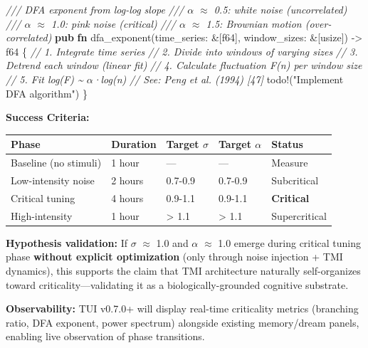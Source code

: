 \documentclass[
]{article}
\newenvironment{Shaded}{}{}
\newcommand{\CommentTok}[1]{\textcolor[rgb]{0.38,0.63,0.69}{\textit{#1}}}
\newcommand{\DataTypeTok}[1]{\textcolor[rgb]{0.56,0.13,0.00}{#1}}
\newcommand{\KeywordTok}[1]{\textcolor[rgb]{0.00,0.44,0.13}{\textbf{#1}}}
\newcommand{\NormalTok}[1]{#1}
\newcommand{\OperatorTok}[1]{\textcolor[rgb]{0.40,0.40,0.40}{#1}}
\newcommand{\PreprocessorTok}[1]{\textcolor[rgb]{0.74,0.48,0.00}{#1}}
\newcommand{\StringTok}[1]{\textcolor[rgb]{0.25,0.44,0.63}{#1}}
\begin{document}
\begin{Shaded}
\begin{Highlighting}[]
\CommentTok{/// DFA exponent from log{-}log slope}
\CommentTok{/// $\alpha$ $\approx$ 0.5: white noise (uncorrelated)}
\CommentTok{/// $\alpha$ $\approx$ 1.0: pink noise (critical)}
\CommentTok{/// $\alpha$ $\approx$ 1.5: Brownian motion (over{-}correlated)}
\KeywordTok{pub} \KeywordTok{fn}\NormalTok{ dfa\_exponent(time\_series}\OperatorTok{:} \OperatorTok{\&}\NormalTok{[}\DataTypeTok{f64}\NormalTok{]}\OperatorTok{,}\NormalTok{ window\_sizes}\OperatorTok{:} \OperatorTok{\&}\NormalTok{[}\DataTypeTok{usize}\NormalTok{]) }\OperatorTok{{-}\textgreater{}} \DataTypeTok{f64} \OperatorTok{\{}
    \CommentTok{// 1. Integrate time series}
    \CommentTok{// 2. Divide into windows of varying sizes}
    \CommentTok{// 3. Detrend each window (linear fit)}
    \CommentTok{// 4. Calculate fluctuation F(n) per window size}
    \CommentTok{// 5. Fit log(F) \textasciitilde{} $\alpha$·log(n)}
    \CommentTok{// See: Peng et al. (1994) [47]}
    \PreprocessorTok{todo!}\NormalTok{(}\StringTok{"Implement DFA algorithm"}\NormalTok{)}
\OperatorTok{\}}
\end{Highlighting}
\end{Shaded}

\textbf{Success Criteria:}

\begin{longtable}[]{@{}lllll@{}}
\toprule\noalign{}
Phase & Duration & Target $\sigma$ & Target $\alpha$ & Status \\
\midrule\noalign{}
\endhead
\bottomrule\noalign{}
\endlastfoot
Baseline (no stimuli) & 1 hour & --- & --- & Measure \\
Low-intensity noise & 2 hours & 0.7-0.9 & 0.7-0.9 & Subcritical \\
Critical tuning & 4 hours & 0.9-1.1 & 0.9-1.1 & \textbf{Critical} \\
High-intensity & 1 hour & \textgreater{} 1.1 & \textgreater{} 1.1 &
Supercritical \\
\end{longtable}

\textbf{Hypothesis validation:} If $\sigma$ $\approx$ 1.0 and $\alpha$ $\approx$ 1.0 emerge during
critical tuning phase \textbf{without explicit optimization} (only
through noise injection + TMI dynamics), this supports the claim that
TMI architecture naturally self-organizes toward
criticality---validating it as a biologically-grounded cognitive
substrate.

\textbf{Observability:} TUI v0.7.0+ will display real-time criticality
metrics (branching ratio, DFA exponent, power spectrum) alongside
existing memory/dream panels, enabling live observation of phase
transitions.
\end{document}
